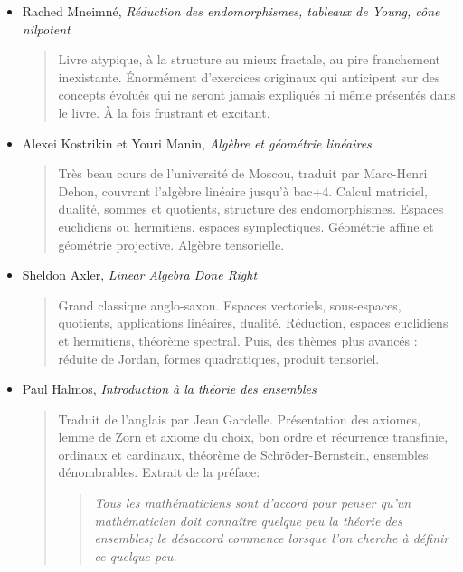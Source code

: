 \documentclass{article}
\begin{document}
\begin{itemize}
\item  Rached Mneimné, \emph{Réduction des endomorphismes, tableaux de Young, cône nilpotent}
\begin{quote}
Livre atypique, à la structure au mieux fractale, au pire franchement inexistante. Énormément d'exercices originaux qui anticipent sur des concepts évolués qui ne seront jamais expliqués ni même présentés dans le livre. %
À la fois frustrant et excitant. 
\end{quote}
\item Alexei Kostrikin et Youri Manin, \emph{Algèbre et géométrie linéaires}
\begin{quote}
Très beau cours de l'université de Moscou, traduit par Marc-Henri Dehon, couvrant l'algèbre linéaire jusqu'à bac+4. Calcul matriciel, dualité, sommes et quotients, structure des endomorphismes. Espaces euclidiens ou hermitiens, espaces symplectiques. Géométrie affine et géométrie projective. Algèbre tensorielle.
\end{quote}
\item Sheldon Axler, \emph{Linear Algebra Done Right}
\begin{quote}
Grand classique anglo-saxon. Espaces vectoriels, sous-espaces, quotients, applications linéaires, dualité. Réduction, espaces euclidiens et hermitiens, théorème spectral. Puis, des thèmes plus avancés :  réduite de Jordan, formes quadratiques, produit tensoriel.
\end{quote}
\item Paul Halmos, \emph{Introduction à la théorie des ensembles}
\begin{quote}
Traduit de l'anglais par Jean Gardelle. Présentation des axiomes, lemme de Zorn et axiome du choix, bon ordre et récurrence transfinie, ordinaux et cardinaux, théorème de Schröder-Bernstein, ensembles dénombrables. Extrait de la préface:
\begin{quote}
\emph{\og Tous les mathématiciens sont d'accord pour penser qu'un mathématicien doit connaître quelque peu la théorie des ensembles; le désaccord commence lorsque l'on cherche à définir ce quelque peu.\fg}
\end{quote}
\end{quote}
\end{itemize}
\end{document}
